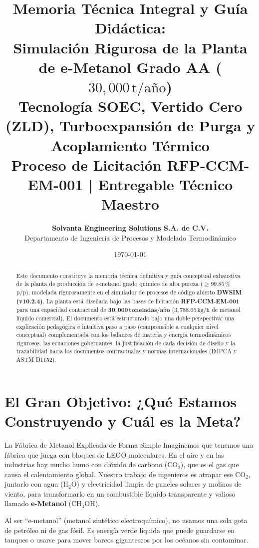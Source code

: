 \documentclass[11pt,a4paper]{article}
\title{\vspace{-1.2cm}
    \textbf{\LARGE \color{solvantablue} Memoria Técnica Integral y Guía Didáctica:}\\[0.3cm]
    \textbf{\Large Simulación Rigurosa de la Planta de e-Metanol Grado AA ($30{,}000\,\text{t/año}$)}\\[0.2cm]
    \textbf{\large Tecnología SOEC, Vertido Cero (ZLD), Turboexpansión de Purga y Acoplamiento Térmico}\\[0.4cm]
    \normalsize Proceso de Licitación RFP-CCM-EM-001 | Entregable Técnico Maestro
}
\author{\textbf{Solvanta Engineering Solutions S.A. de C.V.}\\
Departamento de Ingeniería de Procesos y Modelado Termodinámico}
\date{\today}
\begin{document}
\maketitle

\begin{abstract}
Este documento constituye la memoria técnica definitiva y guía conceptual exhaustiva de la planta de producción de e-metanol grado químico de alta pureza ($\ge 99.85\,\%$ p/p), modelada rigurosamente en el simulador de procesos de código abierto \textbf{DWSIM (v10.2.4)}. La planta está diseñada bajo las bases de licitación \textbf{RFP-CCM-EM-001} para una capacidad contractual de $\mathbf{30{,}000\,\text{toneladas/año}}$ ($3{,}788.65\,\text{kg/h}$ de metanol líquido comercial). El documento está estructurado bajo una doble perspectiva: una explicación pedagógica e intuitiva paso a paso (comprensible a cualquier nivel conceptual) complementada con los balances de materia y energía termodinámicos rigurosos, las ecuaciones gobernantes, la justificación de cada decisión de diseño y la trazabilidad hacia los documentos contractuales y normas internacionales (IMPCA y ASTM D1152).
\end{abstract}

\tableofcontents
\newpage

\section{El Gran Objetivo: ¿Qué Estamos Construyendo y Cuál es la Meta?}

\begin{pedagogico}{La Fábrica de Metanol Explicada de Forma Simple}
Imaginemos que tenemos una fábrica que juega con bloques de LEGO moleculares. 
En el aire y en las industrias hay mucho humo con dióxido de carbono ($\text{CO}_2$), que es el gas que causa el calentamiento global. Nuestro trabajo de ingenieros es atrapar ese $\text{CO}_2$, juntarlo con agua ($\text{H}_2\text{O}$) y electricidad limpia de paneles solares y molinos de viento, para transformarlo en un combustible líquido transparente y valioso llamado \textbf{e-Metanol} ($\text{CH}_3\text{OH}$).

Al ser ``e-metanol'' (metanol sintético electroquímico), no usamos una sola gota de petróleo ni de gas fósil. Es energía verde líquida que puede guardarse en tanques o usarse para mover barcos gigantescos por los océanos sin contaminar.
\end{pedagogico}
\end{document}
